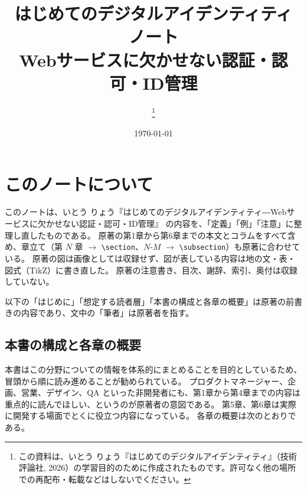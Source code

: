 \documentclass[uplatex]{jsarticle}
\title{はじめてのデジタルアイデンティティ ノート\\[0.5em]\large Webサービスに欠かせない認証・認可・ID管理}
\author{\thanks{この資料は、いとう りょう『はじめてのデジタルアイデンティティ』（技術評論社, 2026）の学習目的のために作成されたものです。許可なく他の場所での再配布・転載などはしないでください。}}
\date{\today}
\begin{document}
\maketitle
\tableofcontents
\newpage

\section*{このノートについて}

このノートは、いとう りょう『はじめてのデジタルアイデンティティ―Webサービスに欠かせない認証・認可・ID管理』\cite{Ito2026} の内容を、「定義」「例」「注意」に整理し直したものである。
原著の第1章から第6章までの本文とコラムをすべて含め、章立て（第 $N$ 章 $\to$ \verb|\section|、$N$-$M$ $\to$ \verb|\subsection|）も原著に合わせている。
原著の図は画像としては収録せず、図が表している内容は地の文・表・図式（TikZ）に書き直した。
原著の注意書き、目次、謝辞、索引、奥付は収録していない。

以下の「はじめに」「想定する読者層」「本書の構成と各章の概要」は原著の前書きの内容であり、文中の「筆者」は原著者を指す。

\subsection*{本書の構成と各章の概要}

本書はこの分野についての情報を体系的にまとめることを目的としているため、冒頭から順に読み進めることが勧められている。
プロダクトマネージャー、企画、営業、デザイン、QA といった非開発者にも、第1章から第4章までの内容は重点的に読んでほしい、というのが原著者の意図である。
第5章、第6章は実際に開発する場面でとくに役立つ内容になっている。
各章の概要は次のとおりである。
\end{document}
